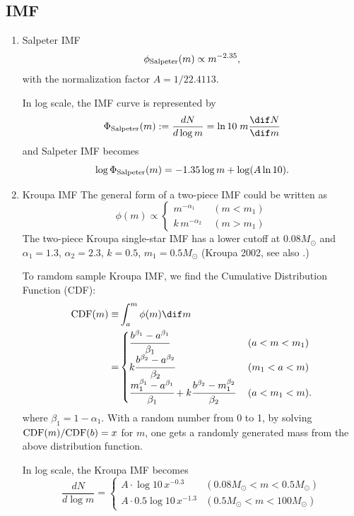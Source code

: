 \subsection{IMF}
\label{sec:orgfb53a2b}
\begin{enumerate}
\item Salpeter IMF
\label{sec:org56dfa66}
$$\phi_{\rm Salpeter}(m) \propto m^{-2.35},$$ with the normalization
factor \(A = 1 / 22.4113\).

In log scale, the IMF curve is represented by
$$\Phi_{\rm Salpeter}(m) := \frac{dN}{d\log m} = \ln 10 \;m \frac{\dif N}{\dif m}$$
and Salpeter IMF becomes
$$\log \Phi_{\rm Salpeter}(m) = -1.35 \log m + \log (A\ln10).$$

\item Kroupa IMF
\label{sec:orgb7b9648}
The general form of a two-piece IMF could be written as
$$%
\phi(m) \propto
\begin{cases}
m^{-\alpha_1} \; &(m < m_1) \\
k \, m^{-\alpha_2} \; &(m > m_1)
\end{cases}$$ The two-piece Kroupa single-star IMF has a lower cutoff at
\(0.08
M_\odot\) and \(\alpha_1 = 1.3\), \(\alpha_2 = 2.3\), \(k = 0.5\),
\(m_1 = 0.5M_{\odot}\) (Kroupa 2002, see also \cite{Maschberger:2013}.)

To ramdom sample Kroupa IMF, we find the Cumulative Distribution
Function (CDF): $$\begin{aligned}
\label{eq:2}
  {\rm CDF}(m) \equiv & \int_a^m \phi(m) \dif m \\
  =&
\begin{cases}
  \cfrac{b^{\beta_{1}} - a^{\beta_1}}{\beta_1} \; &(a < m < m_1) \\
  k \cfrac{b^{\beta_{2}} - a^{\beta_2}}{\beta_2} \; &(m_1 < a < m) \\
  \cfrac{m_1^{\beta_{1}} - a^{\beta_1}}{\beta_1} +
  k \cfrac{b^{\beta_{2}} - m_1^{\beta_2}}{\beta_2} \; &(a < m_1 < m).
\end{cases}\end{aligned}$$ where \(\beta_1 = 1 - \alpha_1\). With a random
number from 0 to 1, by solving \({\rm CDF}(m) / {\rm
  CDF}(b) = x\) for \(m\), one gets a randomly generated mass from the
above distribution function.

In log scale, the Kroupa IMF becomes $$\frac{dN}{d\log{m}} =
  \begin{cases}
    A \cdot \log 10 \, x^{-0.3} & (0.08M_\odot < m < 0.5M_\odot)\\
    A \cdot 0.5 \log 10 \, x^{-1.3} & (0.5M_\odot < m < 100M_\odot)
  \end{cases}$$
\end{enumerate}

